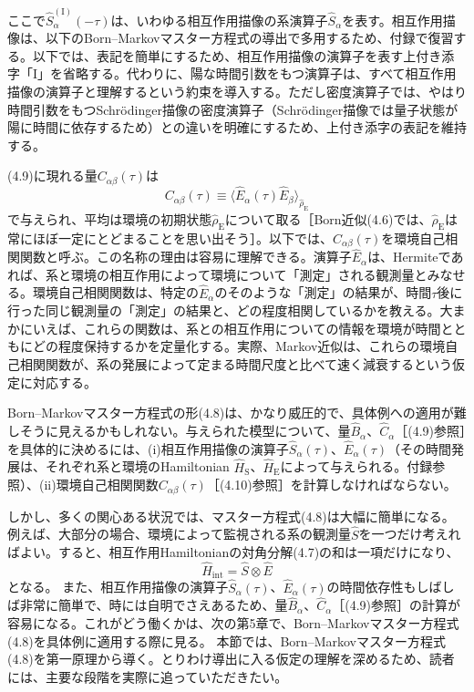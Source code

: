 \hypertarget{srcpage:157}{}\label{srcpage:157}
ここで$\hat S_\alpha^{(\mathrm I)}(-\tau)$は、いわゆる相互作用描像の系演算子$\hat S_\alpha$を表す。相互作用描像は、以下のBorn--Markovマスター方程式の導出で多用するため、付録で復習する。以下では、表記を簡単にするため、相互作用描像の演算子を表す上付き添字「I」を省略する。代わりに、陽な時間引数をもつ演算子は、すべて相互作用描像の演算子と理解するという約束を導入する。ただし密度演算子では、やはり時間引数をもつSchrödinger描像の密度演算子（Schrödinger描像では量子状態が陽に時間に依存するため）との違いを明確にするため、上付き添字の表記を維持する。

(4.9)に現れる量$C_{\alpha\beta}(\tau)$は
\begin{equation}
C_{\alpha\beta}(\tau)\equiv\langle\hat E_\alpha(\tau)\hat E_\beta\rangle_{\hat\rho_{\mathrm E}}
\tag{4.10}
\end{equation}
で与えられ、平均は環境の初期状態$\hat\rho_{\mathrm E}$について取る［Born近似(4.6)では、$\hat\rho_{\mathrm E}$は常にほぼ一定にとどまることを思い出そう］。以下では、$C_{\alpha\beta}(\tau)$を環境自己相関関数と呼ぶ。この名称の理由は容易に理解できる。演算子$\hat E_\alpha$は、Hermiteであれば、系と環境の相互作用によって環境について「測定」される観測量とみなせる。環境自己相関関数は、特定の$\hat E_\alpha$のそのような「測定」の結果が、時間$\tau$後に行った同じ観測量の「測定」の結果と、どの程度相関しているかを教える。大まかにいえば、これらの関数は、系との相互作用についての情報を環境が時間とともにどの程度保持するかを定量化する。実際、Markov近似は、これらの環境自己相関関数が、系の発展によって定まる時間尺度と比べて速く減衰するという仮定に対応する。

Born--Markovマスター方程式の形(4.8)は、かなり威圧的で、具体例への適用が難しそうに見えるかもしれない。与えられた模型について、量$\hat B_\alpha$、$\hat C_\alpha$［(4.9)参照］を具体的に決めるには、(i)相互作用描像の演算子$\hat S_\alpha(\tau)$、$\hat E_\alpha(\tau)$（その時間発展は、それぞれ系と環境のHamiltonian $\hat H_{\mathrm S}$、$\hat H_{\mathrm E}$によって与えられる。付録参照）、(ii)環境自己相関関数$C_{\alpha\beta}(\tau)$［(4.10)参照］を計算しなければならない。

しかし、多くの関心ある状況では、マスター方程式(4.8)は大幅に簡単になる。例えば、大部分の場合、環境によって監視される系の観測量$\hat S$を一つだけ考えればよい。すると、相互作用Hamiltonianの対角分解(4.7)の和は一項だけになり、
\begin{equation}
\hat H_{\mathrm{int}}=\hat S\otimes\hat E
\tag{4.11}
\end{equation}
となる。
\hypertarget{srcpage:158}{}\label{srcpage:158}
また、相互作用描像の演算子$\hat S_\alpha(\tau)$、$\hat E_\alpha(\tau)$の時間依存性もしばしば非常に簡単で、時には自明でさえあるため、量$\hat B_\alpha$、$\hat C_\alpha$［(4.9)参照］の計算が容易になる。これがどう働くかは、次の第5章で、Born--Markovマスター方程式(4.8)を具体例に適用する際に見る。
本節では、Born--Markovマスター方程式(4.8)を第一原理から導く。とりわけ導出に入る仮定の理解を深めるため、読者には、主要な段階を実際に追っていただきたい。

